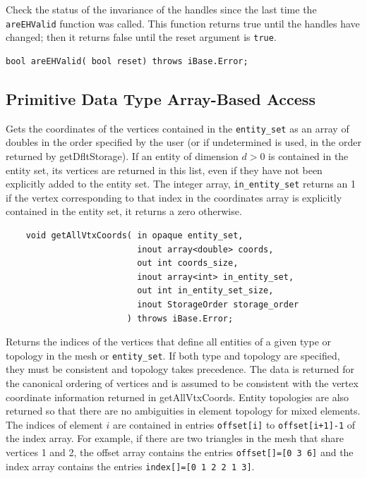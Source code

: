 \documentclass{article}
\begin{document}
Check the status of the invariance of the handles since the last 
time the {\tt areEHValid} function was called. This function returns 
true until the handles have changed; then it returns false until the reset 
argument is {\tt true}.
\begin{verbatim}
bool areEHValid( bool reset) throws iBase.Error;
\end{verbatim}

\subsection{Primitive Data Type Array-Based Access}

Gets the coordinates of the vertices contained in the {\tt entity\_set} 
as an array of doubles in the order specified by the user (or 
if undetermined is used, in the order returned by getDfltStorage). 
If an entity of dimension $d>0$ is contained in the entity 
set, its vertices are returned in this list, even if they have 
not been explicitly added to the entity set. The integer array, 
{\tt in\_entity\_set} returns an 1 if the vertex corresponding to that 
index in the coordinates array is explicitly contained in the 
entity set, it returns a zero otherwise. 

\begin{verbatim}    
    void getAllVtxCoords( in opaque entity_set, 
                          inout array<double> coords,   
                          out int coords_size, 
                          inout array<int> in_entity_set, 
                          out int in_entity_set_size, 
                          inout StorageOrder storage_order
                        ) throws iBase.Error;
\end{verbatim}

Returns the indices of the vertices that define all entities 
of a given type or topology in the mesh or {\tt entity\_set}. If both 
type and topology are specified, they must be consistent and 
topology takes precedence. The data is returned for the canonical 
ordering of vertices and is assumed to be consistent with the 
vertex coordinate information returned in getAllVtxCoords. Entity 
topologies are also returned so that there are no ambiguities 
in element topology for mixed elements. The indices of element $i$
are contained in entries {\tt offset[i]} to {\tt offset[i+1]-1} of the index 
array. For example, if there are two triangles in the mesh that 
share vertices 1 and 2, the offset array contains the entries 
{\tt offset[]=[0 3 6]} and the index array contains the entries 
{\tt index[]=[0 1 2 2 1 3]}.  
\end{document}
